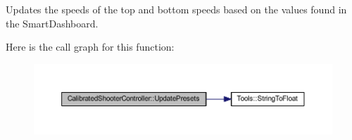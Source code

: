 \-Updates the speeds of the top and bottom speeds based on the values found in the \-Smart\-Dashboard. 



\-Here is the call graph for this function\-:\nopagebreak
\begin{figure}[H]
\begin{center}
\leavevmode
\includegraphics[width=350pt]{class_calibrated_shooter_controller_ab7799ac7013ba36a2a1d90c6e7c57564_cgraph}
\end{center}
\end{figure}




